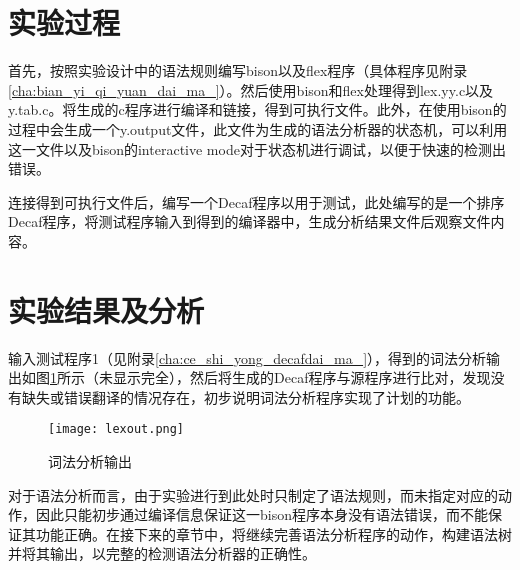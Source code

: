 \section{实验过程}
\label{sec:shi_yan_bu_zou_1}
\par 首先，按照实验设计中的语法规则编写bison以及flex程序（具体程序见附录\ref{cha:bian_yi_qi_yuan_dai_ma_}）。然后使用bison和flex处理得到lex.yy.c以及y.tab.c。将生成的c程序进行编译和链接，得到可执行文件。此外，在使用bison的过程中会生成一个y.output文件，此文件为生成的语法分析器的状态机，可以利用这一文件以及bison的interactive mode对于状态机进行调试，以便于快速的检测出错误。
\par 连接得到可执行文件后，编写一个Decaf程序以用于测试，此处编写的是一个排序Decaf程序，将测试程序输入到得到的编译器中，生成分析结果文件后观察文件内容。

\section{实验结果及分析}
\label{sec:shi_yan_jie_guo_ji_fen_xi_1}

\par 输入测试程序1（见附录\ref{cha:ce_shi_yong_decafdai_ma_}），得到的词法分析输出如图\ref{fig:lexout}所示（未显示完全），然后将生成的Decaf程序与源程序进行比对，发现没有缺失或错误翻译的情况存在，初步说明词法分析程序实现了计划的功能。
\begin{figure}[htpb]
    \centering
    \texttt{[image: lexout.png]}
    \caption{词法分析输出}
    \label{fig:lexout}
\end{figure}

\par 对于语法分析而言，由于实验进行到此处时只制定了语法规则，而未指定对应的动作，因此只能初步通过编译信息保证这一bison程序本身没有语法错误，而不能保证其功能正确。在接下来的章节中，将继续完善语法分析程序的动作，构建语法树并将其输出，以完整的检测语法分析器的正确性。


